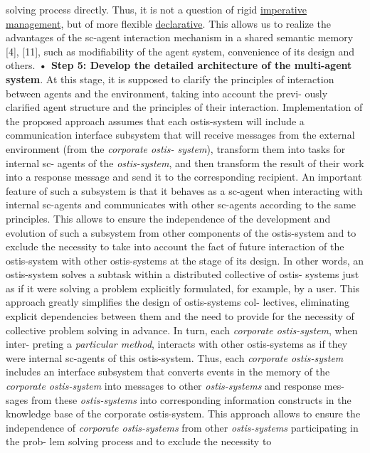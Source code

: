 \documentclass{article}
\begin{document}
solving process directly. Thus, it is not a question of
rigid \underline{imperative management}, but of more flexible
\underline{declarative}. This allows us to realize the advantages
of the sc-agent interaction mechanism in a shared
semantic memory [4], [11], such as modifiability
of the agent system, convenience of its design and
others.
\textbf{• Step 5: Develop the detailed architecture of the
multi-agent system}. At this stage, it is supposed to
clarify the principles of interaction between agents
and the environment, taking into account the previ-
ously clarified agent structure and the principles of
their interaction.
Implementation of the proposed approach assumes
that each ostis-system will include a communication
interface subsystem that will receive messages from
the external environment (from the \textit{corporate ostis-
system}), transform them into tasks for internal sc-
agents of the \textit{ostis-system}, and then transform the
result of their work into a response message and
send it to the corresponding recipient. An important
feature of such a subsystem is that it behaves as
a sc-agent when interacting with internal sc-agents
and communicates with other sc-agents according
to the same principles. This allows to ensure the
independence of the development and evolution of
such a subsystem from other components of the
ostis-system and to exclude the necessity to take
into account the fact of future interaction of the
ostis-system with other ostis-systems at the stage of
its design. In other words, an ostis-system solves
a subtask within a distributed collective of ostis-
systems just as if it were solving a problem explicitly
formulated, for example, by a user. This approach
greatly simplifies the design of ostis-systems col-
lectives, eliminating explicit dependencies between
them and the need to provide for the necessity of
collective problem solving in advance.
In turn, each \textit{corporate ostis-system}, when inter-
preting a \textit{particular method}, interacts with other
ostis-systems as if they were internal sc-agents of
this ostis-system. Thus, each \textit{corporate ostis-system}
includes an interface subsystem that converts events
in the memory of the \textit{corporate ostis-system} into
messages to other \textit{ostis-systems} and response mes-
sages from these \textit{ostis-systems} into corresponding
information constructs in the knowledge base of
the corporate ostis-system. This approach allows to
ensure the independence of \textit{corporate ostis-systems}
from other \textit{ostis-systems} participating in the prob-
lem solving process and to exclude the necessity to
\end{document}
